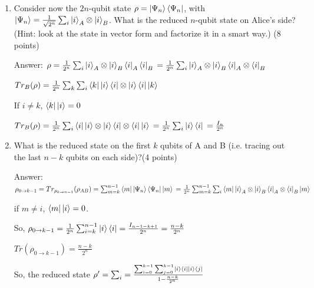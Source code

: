 \documentclass{article}
\begin{document}
\begin{enumerate}
    \item Consider now the $2n$-qubit state $\rho = \ket{\Psi_n}\bra{\Psi_n}$, with $\ket{\Psi_n} = \frac{1}{\sqrt{2^n}}\sum_i \ket{i}_A \otimes \ket{i}_B$. What is the reduced $n$-qubit state on Alice's side? (Hint: look at the state in vector form and factorize it in a smart way.) (8 points)


          Answer: $\rho=\frac{1}{2^n}\sum_i\ket{i}_A\otimes \ket{i}_B\bra{i}_A\bra{i}_B
              \\=\frac{1}{2^n}\sum_i\ket{i}_A\otimes\ket{i}_B\bra{i}_A\otimes\bra{i}_B
          $

          $Tr_B(\rho)=\frac{1}{2^n}\sum_k\sum_i\bra{k}\ket{i}\bra{i}\otimes\ket{i}\bra{i}\ket{k}$

          If $i\neq k$, $\bra{k}\ket{i}=0$


          $Tr_B(\rho)=\frac{1}{2^n}\sum_i\bra{i}\ket{i}\otimes\ket{i}\bra{i}\otimes\bra{i}\ket{i}
              \\=\frac{1}{2^n}\sum_i\ket{i}\bra{i}
              \\=\frac{I_n}{2^n}
          $
    \item What is the reduced state on the first $k$ qubits of A and B (i.e. tracing out the last $n - k$ qubits on each side)?(4 points)

          Answer: $\rho_{0 \to k-1} = Tr_{\rho_{k \to n-1}}(\rho_{AB}) = \sum_{m=k}^{n-1}\bra{m}\ket{\Psi_n}\bra{\Psi_n}\ket{m}
              \\=\frac{1}{2^n}\sum_{m=k}^{n-1}\sum_i\bra{m}\ket{i}_A\otimes\ket{i}_B\bra{i}_A\otimes\bra{i}_B\ket{m}
          $

          if $m\neq i$, $\bra{m}\ket{i}=0$.

          So, $\rho_{0 \to k-1}=\frac{1}{2^n}\sum_{i=k}^{n-1}\ket{i}\bra{i}=\frac{I_{n-1-k+1}}{2^n}=\frac{n-k}{2^n}$

          $Tr(\rho_{0 \to k-1})=\frac{n-k}{2^n}$

          So, the reduced state $\rho'=\sum_i=\frac{\sum_{i=0}^{k-1}\sum_{j=0}^{k-1}\ket{i}\bra{i}\ket{i}\bra{j}}{1-\frac{n-k}{2^n}}$
\end{enumerate}
\end{document}
